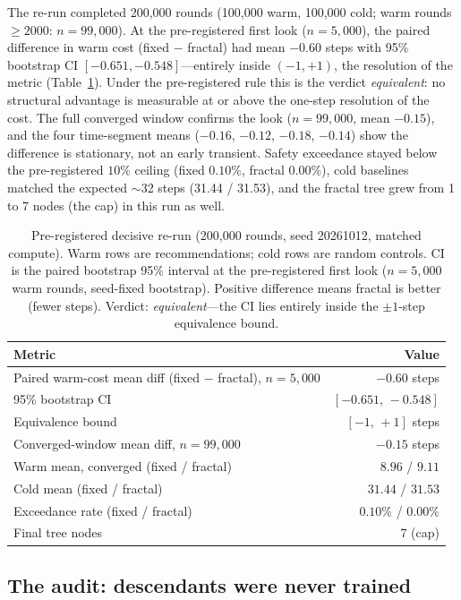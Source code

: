 \documentclass[11pt]{article}
\begin{document}
The re-run completed 200,000 rounds (100,000 warm, 100,000 cold; warm rounds $\ge 2000$: $n=99{,}000$). At the pre-registered first look ($n=5{,}000$), the paired difference in warm cost (fixed $-$ fractal) had mean $-0.60$ steps with 95\% bootstrap CI $[-0.651,-0.548]$---entirely inside $(-1,+1)$, the resolution of the metric (Table~\ref{tab:rerun}). Under the pre-registered rule this is the verdict \emph{equivalent}: no structural advantage is measurable at or above the one-step resolution of the cost. The full converged window confirms the look ($n=99{,}000$, mean $-0.15$), and the four time-segment means ($-0.16$, $-0.12$, $-0.18$, $-0.14$) show the difference is stationary, not an early transient. Safety exceedance stayed below the pre-registered $10\%$ ceiling (fixed $0.10\%$, fractal $0.00\%$), cold baselines matched the expected $\sim$32 steps (31.44 / 31.53), and the fractal tree grew from 1 to 7 nodes (the cap) in this run as well.

\begin{table}[t]
\centering
\caption{Pre-registered decisive re-run (200,000 rounds, seed 20261012, matched compute). Warm rows are recommendations; cold rows are random controls. CI is the paired bootstrap 95\% interval at the pre-registered first look ($n=5{,}000$ warm rounds, seed-fixed bootstrap). Positive difference means fractal is better (fewer steps). Verdict: \emph{equivalent}---the CI lies entirely inside the $\pm 1$-step equivalence bound.}
\label{tab:rerun}
\begin{tabular}{lr}
\toprule
Metric & Value \\
\midrule
Paired warm-cost mean diff (fixed $-$ fractal), $n{=}5{,}000$ & $-0.60$ steps \\
95\% bootstrap CI & $[-0.651,\,-0.548]$ \\
Equivalence bound & $[-1,\,+1]$ steps \\
Converged-window mean diff, $n{=}99{,}000$ & $-0.15$ steps \\
Warm mean, converged (fixed / fractal) & $8.96$ / $9.11$ \\
Cold mean (fixed / fractal) & $31.44$ / $31.53$ \\
Exceedance rate (fixed / fractal) & $0.10\%$ / $0.00\%$ \\
Final tree nodes & 7 (cap) \\
\bottomrule
\end{tabular}
\end{table}

\subsection{The audit: descendants were never trained}\label{sec:audit}
\end{document}
